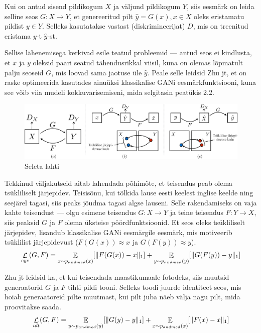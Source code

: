 \documentclass{vilgym}
\DeclareMathOperator{\EX}{\mathbb{E}}
\DeclareMathOperator{\loss}{\mathcal{L}}
\DeclarePairedDelimiter{\norm}{\lVert}{\rVert}
\begin{document}
	Kui on antud sisend pildikogum $ X $ ja väljund pildikogum $ Y $, siis eesmärk on leida selline seos $ G: X \rightarrow Y $, et genereeritud pilt $ \hat{y} = G(x), x \in X $ oleks eristamatu pildist $ y \in Y $. Selleks kasutatakse vastast (diskrimineerijat) $ D $, mis on treenitud eristama $ y $-t $ \hat{y} $-st. 

	Sellise lähenemisega kerkivad esile teatud probleemid --- antud seos ei kindlusta, et $ x $ ja $ y $ oleksid paari seatud tähendusrikkal viisil, kuna on olemas lõpmatult palju seoseid $ G $, mis loovad sama jaotuse üle $ \hat{y} $. Peale selle leidsid Zhu jt, et on raske optimeerida kasutades ainuüksi klassikalise GANi eesmärkfunktsiooni, kuna see võib viia mudeli kokkuvarisemiseni, mida selgitasin peatükis 2.2.

	\begin{figure}[t]
		\centering
			\includegraphics[width=\linewidth]{images/cycle_consistency.png}
			\caption{Seleta lahti \parencite{cyclegan}}
			\label{fig:cycle_loss}
	\end{figure}

	Tekkinud väljakutseid aitab lahendada põhimõte, et teisendus peab olema tsükliliselt järjepidev. Teisisõnu, kui tõlkida lause eesti keelest inglise keelde ning seejärel tagasi, siis peaks jõudma tagasi algse lauseni. Selle rakendamiseks on vaja kahte teisendust --- olgu esimene teisendus $ G\colon X \rightarrow Y $ ja teine teisendus $ F\colon Y \rightarrow X $, siis peaksid $ G $ ja $ F $ olema üksteise pöördfunktsioonid. Et seos oleks tsükliliselt järjepidev, lisandub klassikalise GANi eesmärgile eesmärk, mis motiveerib tsüklilist järjepidevust ($ F(G(x)) \approx x $ ja $ G(F(y)) \approx y $).
	\begin{equation}
		\loss_{cyc}(G,F) = \EX_{x\sim p_{andmed}(x)}[\norm{F(G(x)) - x}_1] + \EX_{y\sim p_{andmed}(y)}[\norm{G(F(y)) - y}_1]
	\end{equation}

	Zhu jt leidsid ka, et kui teisendada maastikumaale fotodeks, siis muutsid generaatorid $ G $ ja $ F $ tihti pildi tooni. Selleks toodi	juurde identiteet seos, mis hoiab generaatoreid pilte muutmast, kui pilt juba näeb välja nagu pilt, mida proovitakse saada.
	\begin{equation} \label{eq:idt}
		\loss_{idt}(G,F) = \EX_{y\sim p_{andmed}(y)}[\norm{G(y) - y}_1] + \EX_{x\sim p_{andmed}(x)}[\norm{F(x) - x}_1]
	\end{equation}
\end{document}
